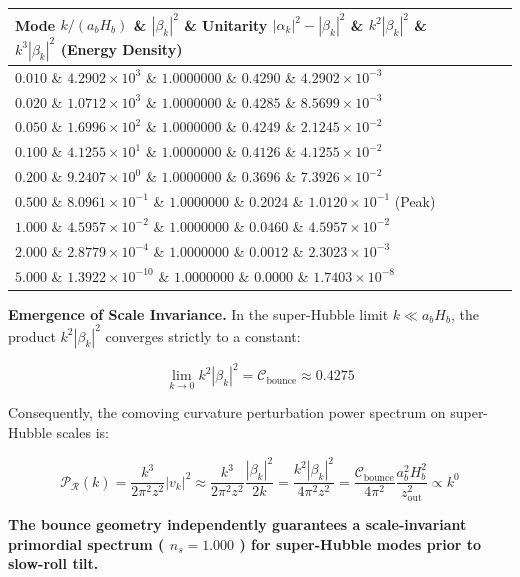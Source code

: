 \documentclass[11pt,a4paper]{article}
\theoremstyle{definition}\newtheorem{definition}{Definition}
\theoremstyle{remark}\newtheorem{remark}{Remark}
\begin{document}
\begin{longtable}{lllll}
\hline
Mode $k / (a_b H_b)$ \& $|\beta_k|^2$ \& Unitarity $|\alpha_k|^2 - |\beta_k|^2$ \& $k^2 |\beta_k|^2$ \& $k^3 |\beta_k|^2$ (Energy Density) \\
\hline
$0.010$ \& $4.2902 \times 10^3$ \& $1.0000000$ \& $0.4290$ \& $4.2902 \times 10^{-3}$ \\
$0.020$ \& $1.0712 \times 10^3$ \& $1.0000000$ \& $0.4285$ \& $8.5699 \times 10^{-3}$ \\
$0.050$ \& $1.6996 \times 10^2$ \& $1.0000000$ \& $0.4249$ \& $2.1245 \times 10^{-2}$ \\
$0.100$ \& $4.1255 \times 10^1$ \& $1.0000000$ \& $0.4126$ \& $4.1255 \times 10^{-2}$ \\
$0.200$ \& $9.2407 \times 10^0$ \& $1.0000000$ \& $0.3696$ \& $7.3926 \times 10^{-2}$ \\
$0.500$ \& $8.0961 \times 10^{-1}$ \& $1.0000000$ \& $0.2024$ \& $1.0120 \times 10^{-1}$ (Peak) \\
$1.000$ \& $4.5957 \times 10^{-2}$ \& $1.0000000$ \& $0.0460$ \& $4.5957 \times 10^{-2}$ \\
$2.000$ \& $2.8779 \times 10^{-4}$ \& $1.0000000$ \& $0.0012$ \& $2.3023 \times 10^{-3}$ \\
$5.000$ \& $1.3922 \times 10^{-10}$ \& $1.0000000$ \& $0.0000$ \& $1.7403 \times 10^{-8}$ \\
\hline
\end{longtable}
\textbf{Emergence of Scale Invariance.} In the super-Hubble limit $k \ll a_b H_b$, the product $k^2 |\beta_k|^2$ converges strictly to a constant:


\begin{equation}
\lim_{k \to 0} k^2 |\beta_k|^2 = \mathcal{C}_{\text{bounce}} \approx 0.4275
\end{equation}


Consequently, the comoving curvature perturbation power spectrum on super-Hubble scales is:


\begin{equation}
\mathcal{P}_\mathcal{R}(k) = \frac{k^3}{2\pi^2 z^2} |v_k|^2 \approx \frac{k^3}{2\pi^2 z^2} \frac{|\beta_k|^2}{2k} = \frac{k^2 |\beta_k|^2}{4\pi^2 z^2} = \frac{\mathcal{C}_{\text{bounce}}}{4\pi^2} \frac{a_b^2 H_b^2}{z_{\text{out}}^2} \propto k^0
\end{equation}


\textbf{The bounce geometry independently guarantees a scale-invariant primordial spectrum ( $n_s = 1.000$ ) for super-Hubble modes prior to slow-roll tilt.}
\end{document}
